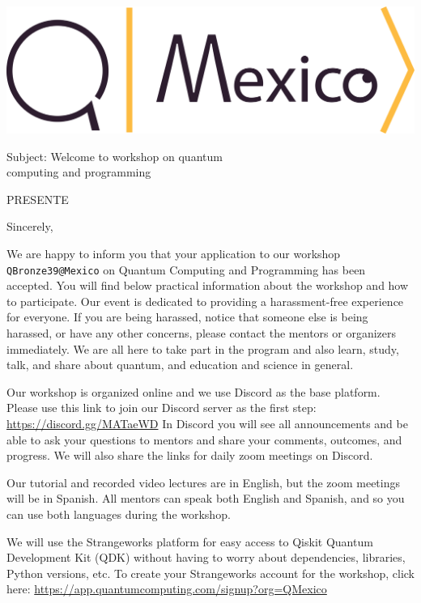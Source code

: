 \begin{minipage}[t]{\textwidth}
\begin{flushleft}
\includegraphics[scale=0.45]{figs/logo-long-tight.png}
\end{flushleft}
\begin{flushright}
  Subject: Welcome to workshop on quantum \\computing and programming
\end{flushright}
\end{minipage}
\recipient{\institution}{{\scriptsize{\alias}}}
\date{\DatetodayLetter}
\opening{{\scriptsize{
PRESENTE}}
}

\closing{Sincerely,}
\makelettertitle
\justify


We are happy to inform you that your application to our workshop {\verb|QBronze39@Mexico|} on Quantum Computing and Programming has been accepted. You will find below practical information about the workshop and how to participate.
Our event is dedicated to providing a harassment-free experience for everyone. If you are being harassed, notice that someone else is being harassed, or have any other concerns, please contact the mentors or organizers immediately. We are all here to take part in the program and also learn, study, talk, and share about quantum, and education and science in general.


Our workshop is organized online and we use Discord as the base platform. Please use this link to join our Discord server as the first step: {\url{https://discord.gg/MATaeWD}} 
In Discord you will see all announcements and be able to ask your questions to mentors and share your comments, outcomes, and progress. We will also share the links for daily zoom meetings on Discord.


Our tutorial and recorded video lectures are in English, but the zoom meetings will be in Spanish. All mentors can speak both English and Spanish, and so you can use both languages during the workshop.


We will use the Strangeworks platform for easy access to Qiskit Quantum Development Kit (QDK) without having to worry about dependencies, libraries, Python versions, etc. To create your Strangeworks account for the workshop, click here:
{\url{https://app.quantumcomputing.com/signup?org=QMexico}} 



